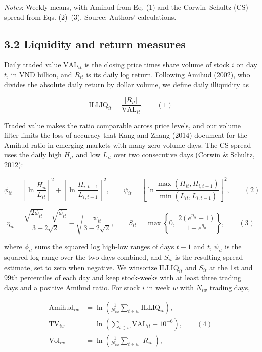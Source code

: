\emph{Notes}: Weekly means, with Amihud from Eq. (1) and the
Corwin--Schultz (CS) spread from Eqs. (2)--(3). Source: Authors'
calculations.

\hypertarget{liquidity-and-return-measures}{%
\subsection{3.2 Liquidity and return
measures}\label{liquidity-and-return-measures}}

Daily traded value \(\mathrm{VAL}_{it}\) is the closing price times
share volume of stock \(i\) on day \(t\), in VND billion, and \(R_{it}\)
is its daily log return. Following Amihud (2002), who divides the
absolute daily return by dollar volume, we define daily illiquidity as

\[\mathrm{ILLIQ}_{it} = \frac{|R_{it}|}{\mathrm{VAL}_{it}}. \qquad (1)\]

Traded value makes the ratio comparable across price levels, and our
volume filter limits the loss of accuracy that Kang and Zhang (2014)
document for the Amihud ratio in emerging markets with many zero-volume
days. The CS spread uses the daily high \(H_{it}\) and low \(L_{it}\)
over two consecutive days (Corwin \& Schultz, 2012):

\[\phi_{it} = \left[\ln\frac{H_{it}}{L_{it}}\right]^2 + \left[\ln\frac{H_{i,t-1}}{L_{i,t-1}}\right]^2, \qquad \psi_{it} = \left[\ln\frac{\max(H_{it}, H_{i,t-1})}{\min(L_{it}, L_{i,t-1})}\right]^2, \qquad (2)\]

\[\eta_{it} = \frac{\sqrt{2\phi_{it}} - \sqrt{\phi_{it}}}{3 - 2\sqrt{2}} - \sqrt{\frac{\psi_{it}}{3 - 2\sqrt{2}}}, \qquad S_{it} = \max\left\{0,\ \frac{2\left(e^{\eta_{it}} - 1\right)}{1 + e^{\eta_{it}}}\right\}, \qquad (3)\]

where \(\phi_{it}\) sums the squared log high-low ranges of days \(t-1\)
and \(t\), \(\psi_{it}\) is the squared log range over the two days
combined, and \(S_{it}\) is the resulting spread estimate, set to zero
when negative. We winsorize \(\mathrm{ILLIQ}_{it}\) and \(S_{it}\) at
the 1st and 99th percentiles of each day and keep stock-weeks with at
least three trading days and a positive Amihud ratio. For stock \(i\) in
week \(w\) with \(N_{iw}\) trading days,

\[\begin{aligned} \mathrm{Amihud}_{iw} &= \ln\left(\frac{1}{N_{iw}}\sum_{t \in w}\mathrm{ILLIQ}_{it}\right), \\ \mathrm{TV}_{iw} &= \ln\left(\sum_{t \in w}\mathrm{VAL}_{it} + 10^{-6}\right), \qquad (4) \\ \mathrm{Vol}_{iw} &= \ln\left(\frac{1}{N_{iw}}\sum_{t \in w}|R_{it}|\right), \end{aligned}\]

